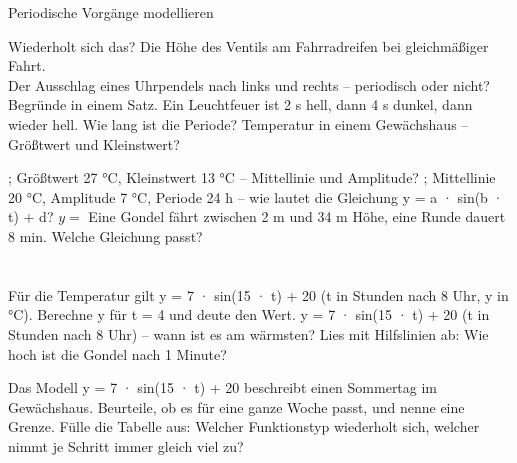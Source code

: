 \setcounter{aufgabe}{20}

\begin{aufgabe}{Periodische Vorgänge modellieren}
\begin{teile}
\teil Wiederholt sich das? Die Höhe des Ventils am Fahrradreifen bei gleichmäßiger Fahrt.\\ 
\teil Der Ausschlag eines Uhrpendels nach links und rechts – periodisch oder nicht? Begründe in einem Satz.
\teil Ein Leuchtfeuer ist 2 s hell, dann 4 s dunkel, dann wieder hell. Wie lang ist die Periode? \leerfeld[s]
\teil Temperatur in einem Gewächshaus – Größtwert und Kleinstwert?

\leerfeld; \leerfeld
\teil Größtwert 27 °C, Kleinstwert 13 °C – Mittellinie und Amplitude? \leerfeld; \leerfeld
\teil Mittellinie 20 °C, Amplitude 7 °C, Periode 24 h – wie lautet die Gleichung y = a · sin(b · t) + d? $y = $ \leerfeld
\teil Eine Gondel fährt zwischen 2 m und 34 m Höhe, eine Runde dauert 8 min. Welche Gleichung passt?\\ \\ \\ 
\teil Für die Temperatur gilt y = 7 · sin(15 · t) + 20 (t in Stunden nach 8 Uhr, y in °C). Berechne y für t = 4 und deute den Wert.
\teil y = 7 · sin(15 · t) + 20 (t in Stunden nach 8 Uhr) – wann ist es am wärmsten? \leerfeld
\teil Lies mit Hilfslinien ab: Wie hoch ist die Gondel nach 1 Minute?

\begin{ksys}[xmin=0,xmax=16,ymin=0,ymax=36,xstep=1,ystep=2,xlabel=t in min,ylabel=Höhe in m,ablesen]\end{ksys}
\leerfeld[m]
\teil Das Modell y = 7 · sin(15 · t) + 20 beschreibt einen Sommertag im Gewächshaus. Beurteile, ob es für eine ganze Woche passt, und nenne eine Grenze.
\teil Fülle die Tabelle aus: Welcher Funktionstyp wiederholt sich, welcher nimmt je Schritt immer gleich viel zu?


\end{teile}
\end{aufgabe}
